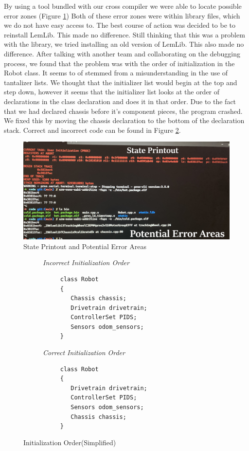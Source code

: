 \documentclass[12pt]{article}
\begin{document}
By using a tool bundled with our cross compiler we were able to locate possible error zones (Figure \ref{FIG::statePrint})
Both of these error zones were within library files, which we do not have easy access to.
The best course of action was decided to be to reinstall LemLib. This made no difference.
Still thinking that this was a problem with the library, we tried installing an old version of LemLib. This also made no difference.
After talking with another team and collaborating on the debugging process, we found that the problem was with the order of initialization in the Robot class. It seems to of stemmed from a misunderstanding in the use of tantalizer lists.
We thought that the initializer list would begin at the top and step down, however it seems that
the initializer list looks at the order of declarations in the class declaration and does it in that order. Due to the fact that we had declared chassis before it's component pieces, the program crashed. We fixed this by moving the chassis declaration to the bottom of the declaration stack.
Correct and incorrect code can be found in Figure \ref{CODE::initOrderSimp}.
\begin{figure}
 \centering
 \caption{State Printout and Potential Error Areas}
 \label{FIG::statePrint}
 \includegraphics[scale=0.1]{statePrint}
\end{figure}

\pagebreak
\begin{figure}
\begin{subfigure}{0.5\textwidth}

\textit{Incorrect Initialization Order}
\begin{verbatim}
     class Robot
     {
        Chassis chassis;
        Drivetrain drivetrain;
        ControllerSet PIDS;
        Sensors odom_sensors;
     }
\end{verbatim}
\end{subfigure}%
\begin{subfigure}{0.5\textwidth}
\textit{Correct Initialization Order}
\begin{verbatim}
     class Robot
     {
        Drivetrain drivetrain;
        ControllerSet PIDS;
        Sensors odom_sensors;
        Chassis chassis;
     }

\end{verbatim}
\end{subfigure}
\caption{Initialization Order(Simplified)}
\label{CODE::initOrderSimp}
\end{figure}
\end{document}
